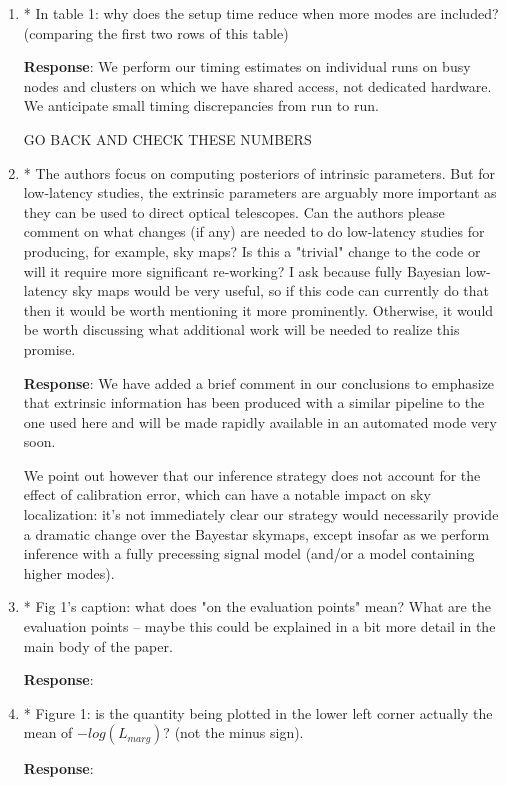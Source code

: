 \documentclass[onecolumn]{revtex4}
\begin{document}
\begin{enumerate}
\item * In table 1: why does the setup time reduce when more modes are
included? (comparing the first two rows of this table)

\noindent \textbf{Response}:  We perform our timing estimates on individual runs on busy nodes and clusters on which we
have shared access, not
dedicated hardware.  We anticipate small timing discrepancies from run to run.

GO BACK AND CHECK THESE NUMBERS

\item * The authors focus on computing posteriors of intrinsic parameters.
But for low-latency studies, the extrinsic parameters are arguably
more important as they can be used to direct optical telescopes. Can
the authors please comment on what changes (if any) are needed to do
low-latency studies for producing, for example, sky maps? Is this a
"trivial" change to the code or will it require more significant
re-working? I ask because fully Bayesian low-latency sky maps would be
very useful, so if this code can currently do that then it would be
worth mentioning it more prominently. Otherwise, it would be worth
discussing what additional work will be needed to realize this
promise.

\noindent \textbf{Response}:  We have added a brief comment in our conclusions to emphasize that extrinsic information
has been produced with a similar pipeline to the one used here and will be made rapidly available in an automated mode very soon.

We point out however that our inference strategy does not account for the effect of calibration error, which can have a
notable impact on sky localization: it's not immediately clear our strategy would necessarily provide a dramatic change
over the Bayestar skymaps, except insofar as we perform inference with a fully precessing signal model (and/or a model
containing higher modes).     

\item * Fig 1's caption: what does "on the evaluation points" mean? What are
the evaluation points -- maybe this could be explained in a bit more
detail in the main body of the paper.

\noindent \textbf{Response}:

\item * Figure 1: is the quantity being plotted in the lower left corner
actually the mean of $-log(L_{marg})$? (not the minus sign).

\noindent \textbf{Response}:


\end{enumerate}
\end{document}

